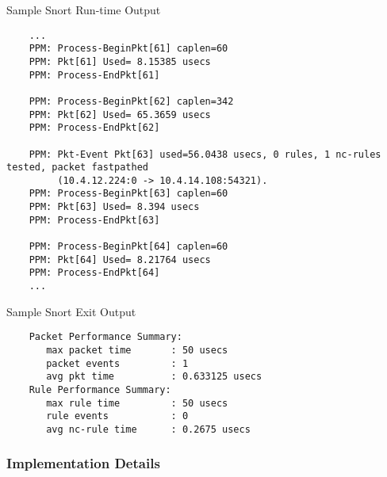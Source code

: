 \documentclass[english]{report}
\begin{document}
Sample Snort Run-time Output

\begin{verbatim}
    ...
    PPM: Process-BeginPkt[61] caplen=60
    PPM: Pkt[61] Used= 8.15385 usecs
    PPM: Process-EndPkt[61]
    
    PPM: Process-BeginPkt[62] caplen=342
    PPM: Pkt[62] Used= 65.3659 usecs
    PPM: Process-EndPkt[62]
    
    PPM: Pkt-Event Pkt[63] used=56.0438 usecs, 0 rules, 1 nc-rules tested, packet fastpathed
         (10.4.12.224:0 -> 10.4.14.108:54321).
    PPM: Process-BeginPkt[63] caplen=60
    PPM: Pkt[63] Used= 8.394 usecs
    PPM: Process-EndPkt[63]
    
    PPM: Process-BeginPkt[64] caplen=60
    PPM: Pkt[64] Used= 8.21764 usecs
    PPM: Process-EndPkt[64]
    ...
\end{verbatim}

Sample Snort Exit Output

\begin{verbatim}
    Packet Performance Summary:
       max packet time       : 50 usecs
       packet events         : 1
       avg pkt time          : 0.633125 usecs
    Rule Performance Summary:
       max rule time         : 50 usecs
       rule events           : 0
       avg nc-rule time      : 0.2675 usecs
\end{verbatim}

\subsubsection{Implementation Details}
\end{document}
